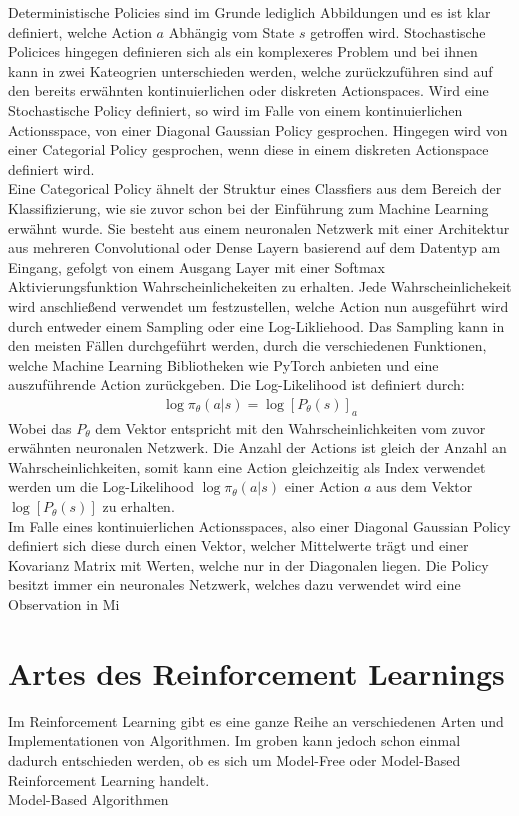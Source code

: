 \documentclass[]{iat}
\begin{document}
Deterministische Policies sind im Grunde lediglich Abbildungen und es ist klar definiert, welche Action $a$ Abhängig vom State $s$ getroffen wird. Stochastische Policices hingegen definieren sich als ein komplexeres Problem und bei ihnen kann in zwei Kateogrien unterschieden werden, welche zurückzuführen sind auf den bereits erwähnten kontinuierlichen oder diskreten Actionspaces. Wird eine Stochastische Policy definiert, so wird im Falle von einem kontinuierlichen Actionsspace, von einer Diagonal Gaussian Policy gesprochen. Hingegen wird von einer Categorial Policy gesprochen, wenn diese in einem diskreten Actionspace definiert wird.\\
Eine Categorical Policy ähnelt der Struktur eines Classfiers aus dem Bereich der Klassifizierung, wie sie zuvor schon bei der Einführung zum Machine Learning erwähnt wurde. Sie besteht aus einem neuronalen Netzwerk mit einer Architektur aus mehreren Convolutional oder Dense Layern basierend auf dem Datentyp am Eingang, gefolgt von einem Ausgang Layer mit einer Softmax Aktivierungsfunktion Wahrscheinlichekeiten zu erhalten. Jede Wahrscheinlichekeit wird anschließend verwendet um festzustellen, welche Action nun ausgeführt wird durch entweder einem Sampling oder eine Log-Likliehood. Das Sampling kann in den meisten Fällen durchgeführt werden, durch die verschiedenen Funktionen, welche Machine Learning Bibliotheken wie PyTorch anbieten und eine auszuführende Action zurückgeben. Die Log-Likelihood ist definiert durch:
\begin{align}
    \log \pi_\theta (a|s) = \log\left[P_\theta(s)\right]_a
\end{align}
Wobei das $P_\theta$ dem Vektor entspricht mit den Wahrscheinlichkeiten vom zuvor erwähnten neuronalen Netzwerk. Die Anzahl der Actions ist gleich der Anzahl an Wahrscheinlichkeiten, somit kann eine Action gleichzeitig als Index verwendet werden um die Log-Likelihood $\log \pi_\theta (a|s)$ einer Action $a$ aus dem Vektor $\log\left[P_\theta(s)\right]$ zu erhalten.\\
Im Falle eines kontinuierlichen Actionsspaces, also einer Diagonal Gaussian Policy definiert sich diese durch einen Vektor, welcher Mittelwerte trägt und einer Kovarianz Matrix mit Werten, welche nur in der Diagonalen liegen. Die Policy besitzt immer ein neuronales Netzwerk, welches dazu verwendet wird eine Observation in Mi

\section{Artes des Reinforcement Learnings} \label{sec:arten_rf}
Im Reinforcement Learning gibt es eine ganze Reihe an verschiedenen Arten und Implementationen von Algorithmen. Im groben kann jedoch schon einmal dadurch entschieden werden, ob es sich um Model-Free oder Model-Based Reinforcement Learning handelt.\\
Model-Based Algorithmen
\end{document}
